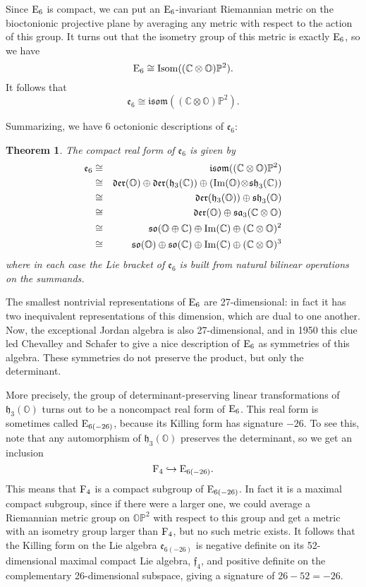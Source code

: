 \documentclass[12pt]{article}
\newcommand\C{{\mathbb C}}
\renewcommand\O{{\mathbb O}}
\newcommand\OP{{\mathbb {OP}}}
\renewcommand\P{{\mathbb P}}
\newcommand{\E}{{\rm E}}
\newcommand{\F}{{\rm F}}
\newcommand{\so}{{\mathfrak {so}}}
\newcommand{\e}{{\mathfrak {e}}}
\newcommand{\f}{{\mathfrak {f}}}
\newcommand{\sa}{{\mathfrak {sa}}}
\newcommand{\h}{{\mathfrak {h}}}
\newcommand{\sh}{{\mathfrak {sh}}}
\newcommand{\isom}{{\mathfrak {isom}}}
\newcommand{\Isom}{{\rm Isom}}
\newcommand{\Der}{{\mathfrak {der}}}
\newcommand{\et}{\hspace{-0.08in}{\bf .}\hspace{0.1in}}
\renewcommand{\Im}{{\rm Im}}
\newcommand{\tensor}{\otimes}
\newcommand{\iso}{\cong}
\newcommand{\ban}{\begin{eqnarray*}}
\newcommand{\ean}{\end{eqnarray*}}
\newtheorem{thm}{Theorem}
\begin{document}
Since $\E_6$ is compact, we can put an $\E_6$-invariant Riemannian metric on the bioctonionic
projective plane by averaging any metric with respect to the action
of this group.  It turns out \cite{Besse} that the isometry group of this 
metric is exactly $\E_6$, so we have
\[        \E_6 \iso \Isom((\C \tensor \O)\P^2).
\]
It follows that
\[
\e_6 \iso \isom((\C \tensor \O)\P^2)  .
\label{e6.8}
\]

Summarizing, we have 6 octonionic descriptions of $\e_6$:   
\begin{thm} \et \label{e6-description}  The compact real form of    
$\e_6$ is given by    
\ban   
 \e_6 &\iso& \isom((\C \tensor \O)\P^2) \\   
 &\iso& \Der(\O) \oplus \Der(\h_3(\C)) \oplus    
        (\Im(\O) \! \tensor\!  \sh_3(\C)) \\   
 &\iso& \Der(\h_3(\O)) \oplus \sh_3(\O)  \\   
 &\iso& \Der(\O) \oplus \sa_3(\C \tensor \O) \\   
 &\iso& \so(\O \oplus \C) \oplus \Im(\C) \oplus (\C \tensor \O)^2  \\   
 &\iso& \so(\O) \oplus \so(\C) \oplus \Im(\C) \oplus (\C \tensor \O)^3   
\ean   
where in each case the Lie bracket of $\e_6$ is built from    
natural bilinear operations on the summands.     
\end{thm}   

The smallest nontrivial representations of $\E_6$ are 27-dimensional:
in fact it has two inequivalent representations of this dimension, which
are dual to one another.  Now, the exceptional Jordan algebra is also
27-dimensional, and in 1950 this clue led Chevalley and Schafer \cite{CS}
to give a nice description of $\E_6$ as symmetries of this algebra.
These symmetries do not preserve the product, but only the determinant.

More precisely, the group of determinant-preserving linear
transformations of $\h_3(\O)$ turns out to be a noncompact real form of
$\E_6$.  This real form is sometimes called $\E_{6(-26)}$, because its
Killing form has signature $-26$.  To
see this, note that any automorphism of $\h_3(\O)$ preserves the
determinant, so we get an inclusion
\[            \F_4 \hookrightarrow \E_{6(-26)}  .\] 
This means that $\F_4$ is a compact subgroup of $\E_{6(-26)}$.  In fact
it is a maximal compact subgroup, since if there were a larger one, we
could average a Riemannian metric group on $\OP^2$ with respect to this
group and get a metric with an isometry group larger than $\F_4$, but no
such metric exists.  It follows that the Killing form on the Lie algebra
$\e_{6(-26)}$ is negative definite on its 52-dimensional maximal compact
Lie algebra, $\f_4$, and positive definite on the complementary
26-dimensional subspace, giving a signature of $26 - 52 = -26$.
\end{document}
